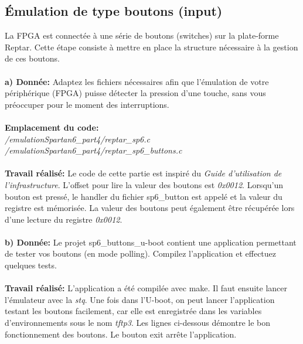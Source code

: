 \subsection{Émulation de type boutons (input)}
La FPGA est connectée à une série de boutons (switches) sur la plate-forme Reptar. Cette étape consiste
à mettre en place la structure nécessaire à la gestion de ces boutons. \\\\
\textbf{a) Donnée: }Adaptez les fichiers nécessaires afin que l'émulation de votre périphérique (FPGA) puisse détecter
la pression d'une touche, sans vous préoccuper pour le moment des interruptions. \\\\
\textbf{Emplacement du code:}\\\textit{/emulationSpartan6\_part4/reptar\_sp6.c}\\
\textit{/emulationSpartan6\_part4/reptar\_sp6\_buttons.c}\\\\
\textbf{Travail réalisé: }Le code de cette partie est inspiré du \textit{Guide d'utilisation de l'infrastructure}. L'offset pour lire la valeur des boutons est \textit{0x0012}. Lorsqu'un bouton est pressé, le handler du fichier sp6\_button est appelé et la valeur du registre est mémorisée. La valeur des boutons peut également être récupérée lors d'une lecture du registre \textit{0x0012}.\\\\
\textbf{b) Donnée: }Le projet sp6\_buttons\_u-boot contient une application permettant de tester vos boutons (en mode
polling). Compilez l'application et effectuez quelques tests.\\\\
\textbf{Travail réalisé: }L'application a été compilée avec make. Il faut ensuite lancer l'émulateur avec la \textit{stq}. Une fois dans l'U-boot, on peut lancer l'application testant les boutons facilement, car elle est enregistrée dans les variables d'environnements sous le nom \textit{tftp3}. Les lignes ci-dessous démontre le bon fonctionnement des boutons. Le bouton exit arrête l'application. 

